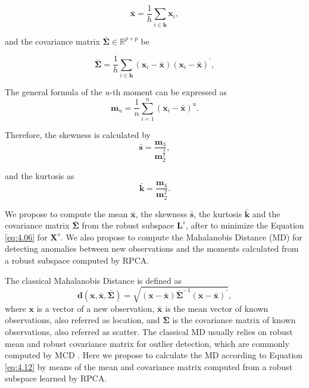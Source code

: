 \begin{equation}\label{eq:4.07}
	\bar{\pmb{x}} = \displaystyle\frac{1}{h}\displaystyle\sum_{i\in \pmb{h}} \pmb{x}_i, 
\end{equation}

and the covariance matrix $\bar{\pmb{\Sigma}} \in \mathbb{R}^{p \times p}$ be

\begin{equation}\label{eq:4.08}
	\bar{\pmb{\Sigma}} = \displaystyle\frac{1}{h}\displaystyle\sum_{i\in \pmb{h}} (\pmb{x}_i - \bar{\pmb{x}})(\pmb{x}_i - \bar{\pmb{x}})^\prime,
\end{equation}

The general formula of the $u$-th moment can be expressed as
\begin{equation}\label{eq:4.09}
	\pmb{m}_u = \displaystyle\frac{1}{n}\displaystyle\sum_{i = 1}^{n}(\pmb{x}_i - \bar{\pmb{x}})^u.
\end{equation}

Therefore, the skewness is calculated by
\begin{equation}\label{eq:4.10}
	\bar{\pmb{s}} = \frac{\pmb{m}_3}{\pmb{m}_2^{\frac{3}{2}}},
\end{equation}

and the kurtosis as
\begin{equation}\label{eq:4.11}
	\bar{\pmb{k}} = \frac{\pmb{m}_4}{\pmb{m}_2^2}.
\end{equation}

We propose to compute the mean $\bar{\pmb{x}}$, the skewness $\bar{\pmb{s}}$, the kurtosis $\bar{\pmb{k}}$ and the covariance matrix $\bar{\pmb{\Sigma}}$ from the robust subspace $\pmb{L}^s$, after to minimize the Equation \ref{eq:4.06} for $\pmb{X}^s$. We also propose to compute the Mahalanobis Distance (MD) for detecting anomalies between new observations and the moments calculated from a robust subspace computed by RPCA. 

The classical Mahalanobis Distance is defined as		
\begin{equation}\label{eq:4.12}
	\pmb{d}(\pmb{x},\bar{\pmb{x}}, \bar{\pmb{\Sigma}}) = \sqrt{(\pmb{x} - \bar{\pmb{x}}) \bar{\pmb{\Sigma}}^{-1}(\pmb{x} - \bar{\pmb{x}})^\prime},
\end{equation}
where $\pmb{x}$ is a vector of a new observation, $\bar{\pmb{x}}$ is the mean vector of known observations, also referred as location, and $\bar{\pmb{\Sigma}}$ is the covariance matrix of known observations, also referred as scatter. The classical MD usually relies on robust mean and robust covariance matrix for outlier detection, which are commonly computed by MCD \cite{rousseeuw1984mcd, rousseeuw1999fastmcd}. Here we propose to calculate the MD according to Equation \ref{eq:4.12} by means of the mean and covariance matrix computed from a robust subspace learned by RPCA. 

